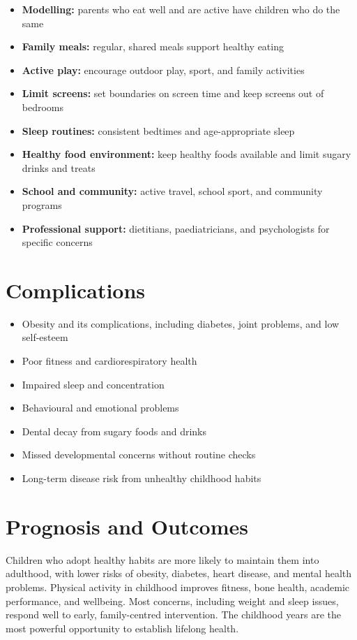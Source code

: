 \begin{itemize}
    \item \textbf{Modelling:} parents who eat well and are active have children who do the same
    \item \textbf{Family meals:} regular, shared meals support healthy eating
    \item \textbf{Active play:} encourage outdoor play, sport, and family activities
    \item \textbf{Limit screens:} set boundaries on screen time and keep screens out of bedrooms
    \item \textbf{Sleep routines:} consistent bedtimes and age-appropriate sleep
    \item \textbf{Healthy food environment:} keep healthy foods available and limit sugary drinks and treats
    \item \textbf{School and community:} active travel, school sport, and community programs
    \item \textbf{Professional support:} dietitians, paediatricians, and psychologists for specific concerns
\end{itemize}

\section*{Complications}
\begin{itemize}
    \item Obesity and its complications, including diabetes, joint problems, and low self-esteem
    \item Poor fitness and cardiorespiratory health
    \item Impaired sleep and concentration
    \item Behavioural and emotional problems
    \item Dental decay from sugary foods and drinks
    \item Missed developmental concerns without routine checks
    \item Long-term disease risk from unhealthy childhood habits
\end{itemize}

\section*{Prognosis and Outcomes}
Children who adopt healthy habits are more likely to maintain them into adulthood, with lower risks of obesity, diabetes, heart disease, and mental health problems. Physical activity in childhood improves fitness, bone health, academic performance, and wellbeing. Most concerns, including weight and sleep issues, respond well to early, family-centred intervention. The childhood years are the most powerful opportunity to establish lifelong health.

